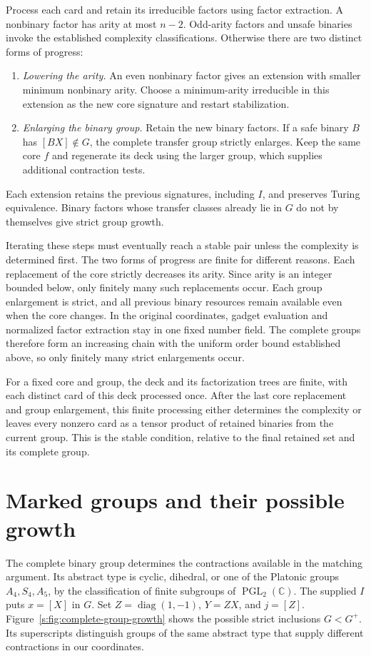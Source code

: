 \documentclass[11pt,letterpaper,onecolumn]{article}
\theoremstyle{plain}
\theoremstyle{definition}
\theoremstyle{remark}
\newcommand{\PGL}{\operatorname{PGL}}
\newcommand{\diag}{\operatorname{diag}}
\begin{document}
Process each card and retain its irreducible factors using factor
extraction. A nonbinary factor has arity at most \(n-2\).
Odd-arity factors and unsafe binaries invoke the established complexity
classifications. Otherwise there are two distinct forms of progress:
\begin{enumerate}[label=\textnormal{(\roman*)}]
\item \emph{Lowering the arity.} An even nonbinary factor gives an
extension with smaller minimum nonbinary arity. Choose a minimum-arity
irreducible in this extension as the new core signature and restart
stabilization.
\item \emph{Enlarging the binary group.} Retain the new binary factors.
If a safe binary \(B\) has \([BX]\notin G\), the complete transfer group
strictly enlarges. Keep the same core \(f\) and regenerate its deck
using the larger group, which supplies additional contraction tests.
\end{enumerate}
Each extension retains the previous signatures, including \(I\), and
preserves Turing equivalence. Binary factors whose transfer classes
already lie in \(G\) do not by themselves give strict group growth.

Iterating these steps must eventually reach a stable pair unless the
complexity is determined first. The two forms of progress are finite
for different reasons.
Each replacement of the core strictly decreases its arity. Since arity
is an integer bounded below, only finitely many such replacements occur.
Each group enlargement is strict, and all previous binary resources
remain available even when the core changes. In the original
coordinates, gadget evaluation and normalized factor extraction stay
in one fixed number field. The complete groups therefore form an
increasing chain with the uniform order bound established above, so
only finitely many strict enlargements occur.

For a fixed core and group, the deck and its factorization trees are
finite, with each distinct card of this deck processed once. After the last core replacement
and group enlargement, this finite processing either determines the
complexity or leaves every nonzero card as a tensor product of retained
binaries from the current group. This is the stable condition, relative
to the final retained set and its complete group.

\section{Marked groups and their possible growth}
\label{s:short:marked}
The complete binary group determines the contractions available in the
matching argument. Its abstract type is cyclic, dihedral, or one of
the Platonic groups \(A_4,S_4,A_5\), by the classification of finite
subgroups of \(\PGL_2(\mathbb C)\). The supplied \(I\) puts \(x=[X]\)
in \(G\). Set \(Z=\diag(1,-1)\), \(Y=ZX\), and \(j=[Z]\).
Figure~\ref{s:fig:complete-group-growth} shows the possible strict
inclusions \(G<G^+\). Its superscripts distinguish groups of the
same abstract type that supply different contractions in our coordinates.
\end{document}
